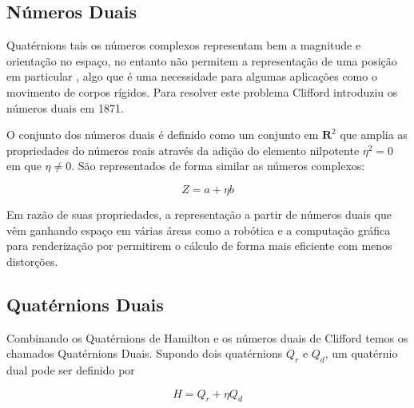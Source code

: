 \subsection{Números Duais}

Quatérnions tais os números complexos representam bem a magnitude e orientação no espaço, no entanto não permitem a representação de uma posição em particular \cite{Clifford1871DQ}, algo que é uma necessidade para algumas aplicações como o movimento de corpos rígidos. Para resolver este problema Clifford introduziu os números duais em 1871.

O conjunto dos números duais é definido como um conjunto em $\mathbf{R}^2$ que amplia as propriedades do números reais através da adição do elemento nilpotente $\eta^2 = 0$ em que $\eta \neq 0$. São representados de forma similar as números complexos:

\begin{equation}
    Z = a + \eta b
\end{equation}


Em razão de suas propriedades, a representação a partir de números duais que vêm ganhando espaço em várias áreas como a robótica \cite{Adorno2011} e a computação gráfica para renderização \cite{kavan2006dual} por permitirem o cálculo de forma mais eficiente com menos distorções. %

\subsection{Quatérnions Duais}

Combinando os Quatérnions de Hamilton e os números duais de Clifford temos os chamados Quatérnions Duais. Supondo dois quatérnions $Q_r$ e $Q_d$, um quatérnio dual pode ser definido por

\begin{equation}
    H = Q_r + \eta Q_d
\end{equation}


